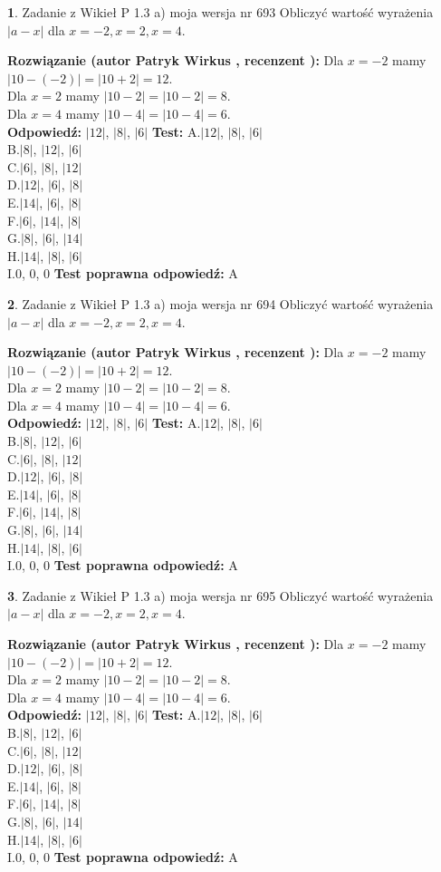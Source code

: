 \documentclass[12pt, a4paper]{article}
\theoremstyle{definition} %
\newtheorem{zad}{}
\newcommand{\zadStart}[1]{\begin{zad}#1\newline}
\newcommand{\zadStop}{\end{zad}}
\newcommand{\rozwStart}[2]{\noindent \textbf{Rozwiązanie (autor #1 , recenzent #2): }\newline}
\newcommand{\rozwStop}{\newline}
\newcommand{\odpStart}{\noindent \textbf{Odpowiedź:}\newline}
\newcommand{\odpStop}{\newline}
\newcommand{\testStart}{\noindent \textbf{Test:}\newline}
\newcommand{\testStop}{\newline}
\newcommand{\kluczStart}{\noindent \textbf{Test poprawna odpowiedź:}\newline}
\newcommand{\kluczStop}{\newline}
\begin{document}
\zadStart{Zadanie z Wikieł P 1.3 a) moja wersja nr 693}
Obliczyć wartość wyrażenia $|a - x|$ dla $x=-2,x=2,x=4$.
\zadStop
\rozwStart{Patryk Wirkus}{}
Dla $x = -2$ mamy $|10 - (-2)| = |10 + 2| = 12$.\\
Dla $x = 2$ mamy $|10 - 2| = |10 - 2| = 8$.\\
Dla $x = 4$ mamy $|10 - 4| = |10 - 4| = 6$.\\
\rozwStop
\odpStart
$|12|$, $|8|$, $|6|$
\odpStop
\testStart
A.$|12|$, $|8|$, $|6|$\\
B.$|8|$, $|12|$, $|6|$\\
C.$|6|$, $|8|$, $|12|$\\
D.$|12|$, $|6|$, $|8|$\\
E.$|14|$, $|6|$, $|8|$\\
F.$|6|$, $|14|$, $|8|$\\
G.$|8|$, $|6|$, $|14|$\\
H.$|14|$, $|8|$, $|6|$\\
I.$0$, $0$, $0$
\testStop
\kluczStart
A
\kluczStop



\zadStart{Zadanie z Wikieł P 1.3 a) moja wersja nr 694}
Obliczyć wartość wyrażenia $|a - x|$ dla $x=-2,x=2,x=4$.
\zadStop
\rozwStart{Patryk Wirkus}{}
Dla $x = -2$ mamy $|10 - (-2)| = |10 + 2| = 12$.\\
Dla $x = 2$ mamy $|10 - 2| = |10 - 2| = 8$.\\
Dla $x = 4$ mamy $|10 - 4| = |10 - 4| = 6$.\\
\rozwStop
\odpStart
$|12|$, $|8|$, $|6|$
\odpStop
\testStart
A.$|12|$, $|8|$, $|6|$\\
B.$|8|$, $|12|$, $|6|$\\
C.$|6|$, $|8|$, $|12|$\\
D.$|12|$, $|6|$, $|8|$\\
E.$|14|$, $|6|$, $|8|$\\
F.$|6|$, $|14|$, $|8|$\\
G.$|8|$, $|6|$, $|14|$\\
H.$|14|$, $|8|$, $|6|$\\
I.$0$, $0$, $0$
\testStop
\kluczStart
A
\kluczStop



\zadStart{Zadanie z Wikieł P 1.3 a) moja wersja nr 695}
Obliczyć wartość wyrażenia $|a - x|$ dla $x=-2,x=2,x=4$.
\zadStop
\rozwStart{Patryk Wirkus}{}
Dla $x = -2$ mamy $|10 - (-2)| = |10 + 2| = 12$.\\
Dla $x = 2$ mamy $|10 - 2| = |10 - 2| = 8$.\\
Dla $x = 4$ mamy $|10 - 4| = |10 - 4| = 6$.\\
\rozwStop
\odpStart
$|12|$, $|8|$, $|6|$
\odpStop
\testStart
A.$|12|$, $|8|$, $|6|$\\
B.$|8|$, $|12|$, $|6|$\\
C.$|6|$, $|8|$, $|12|$\\
D.$|12|$, $|6|$, $|8|$\\
E.$|14|$, $|6|$, $|8|$\\
F.$|6|$, $|14|$, $|8|$\\
G.$|8|$, $|6|$, $|14|$\\
H.$|14|$, $|8|$, $|6|$\\
I.$0$, $0$, $0$
\testStop
\kluczStart
A
\kluczStop
\end{document}
